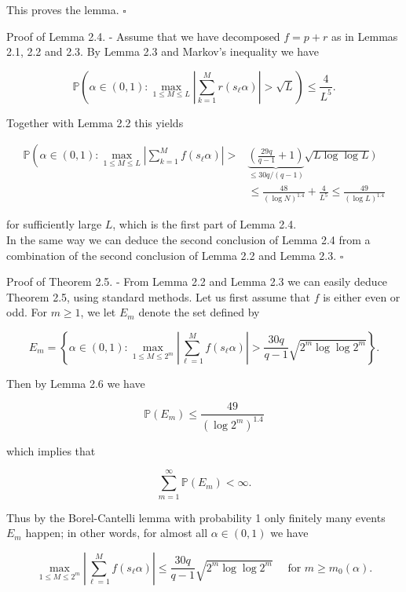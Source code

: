 \documentclass[10pt]{article}
\begin{document}
This proves the lemma. \(\square\)

Proof of Lemma 2.4. - Assume that we have decomposed $f=p+r$ as in Lemmas 2.1, 2.2 and 2.3. By Lemma 2.3 and Markov's inequality we have

$$
\mathbb{P}\left(\alpha \in(0,1): \max _{1 \leqslant M \leqslant L}\left|\sum_{k=1}^{M} r\left(s_{\ell} \alpha\right)\right|>\sqrt{L}\right) \leqslant \frac{4}{L^{5}} .
$$

Together with Lemma 2.2 this yields

$$
\begin{aligned}
\mathbb{P}\left(\alpha \in(0,1): \max _{1 \leqslant M \leqslant L}\left|\sum_{k=1}^{M} f\left(s_{\ell} \alpha\right)\right|>\right. & \underbrace{\left(\frac{29 q}{q-1}+1\right)}_{\leqslant 30 q /(q-1)} \sqrt{L \log \log L}) \\
& \leqslant \frac{48}{(\log N)^{1.4}}+\frac{4}{L^{5}} \leqslant \frac{49}{(\log L)^{1.4}}
\end{aligned}
$$

for sufficiently large $L$, which is the first part of Lemma 2.4.\\
In the same way we can deduce the second conclusion of Lemma 2.4 from a combination of the second conclusion of Lemma 2.2 and Lemma 2.3. \(\square\)

Proof of Theorem 2.5. - From Lemma 2.2 and Lemma 2.3 we can easily deduce Theorem 2.5, using standard methods. Let us first assume that $f$ is either even or odd. For $m \geqslant 1$, we let $E_{m}$ denote the set defined by

$$
E_{m}=\left\{\alpha \in(0,1): \max _{1 \leqslant M \leqslant 2^{m}}\left|\sum_{\ell=1}^{M} f\left(s_{\ell} \alpha\right)\right|>\frac{30 q}{q-1} \sqrt{2^{m} \log \log 2^{m}}\right\} .
$$

Then by Lemma 2.6 we have


\begin{equation*}
\mathbb{P}\left(E_{m}\right) \leqslant \frac{49}{\left(\log 2^{m}\right)^{1.4}} \tag{3.19}
\end{equation*}


which implies that

$$
\sum_{m=1}^{\infty} \mathbb{P}\left(E_{m}\right)<\infty .
$$

Thus by the Borel-Cantelli lemma with probability 1 only finitely many events $E_{m}$ happen; in other words, for almost all $\alpha \in(0,1)$ we have

$$
\max _{1 \leqslant M \leqslant 2^{m}}\left|\sum_{\ell=1}^{M} f\left(s_{\ell} \alpha\right)\right| \leqslant \frac{30 q}{q-1} \sqrt{2^{m} \log \log 2^{m}} \quad \text { for } m \geqslant m_{0}(\alpha) .
$$
\end{document}
